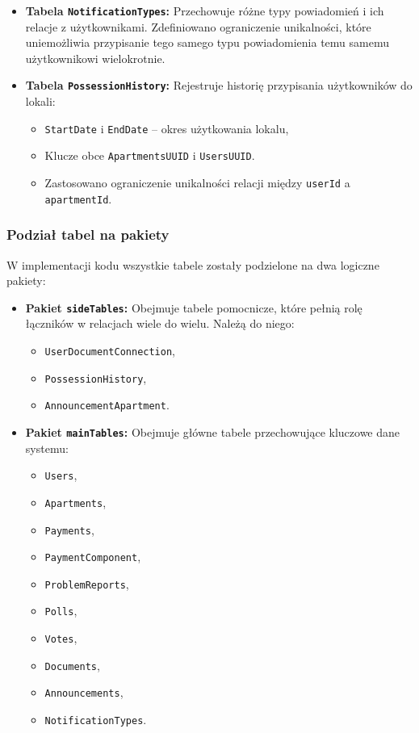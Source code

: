 \begin{itemize}
    \item \textbf{Tabela \texttt{NotificationTypes}:}
    Przechowuje różne typy powiadomień i ich relacje z użytkownikami. Zdefiniowano ograniczenie unikalności, które uniemożliwia przypisanie tego samego typu powiadomienia temu samemu użytkownikowi wielokrotnie.

    \item \textbf{Tabela \texttt{PossessionHistory}:}
    Rejestruje historię przypisania użytkowników do lokali:
    \begin{itemize}
        \item \texttt{StartDate} i \texttt{EndDate} -- okres użytkowania lokalu,
        \item Klucze obce \texttt{ApartmentsUUID} i \texttt{UsersUUID}.
        \item Zastosowano ograniczenie unikalności relacji między \texttt{userId} a \texttt{apartmentId}.
    \end{itemize}
\end{itemize}

\subsubsection{Podział tabel na pakiety}

W implementacji kodu wszystkie tabele zostały podzielone na dwa logiczne pakiety:
\begin{itemize}
    \item \textbf{Pakiet \texttt{sideTables}:} Obejmuje tabele pomocnicze, które pełnią rolę łączników w relacjach wiele do wielu. Należą do niego:
    \begin{itemize}
        \item \texttt{UserDocumentConnection},
        \item \texttt{PossessionHistory},
        \item \texttt{AnnouncementApartment}.
    \end{itemize}

    \item \textbf{Pakiet \texttt{mainTables}:} Obejmuje główne tabele przechowujące kluczowe dane systemu:
		\begin{multicols}{2}\setlength\topskip{0pt}
    \begin{itemize}
        \item \texttt{Users},
        \item \texttt{Apartments},
        \item \texttt{Payments},
        \item \texttt{PaymentComponent},
        \item \texttt{ProblemReports},
        \item \texttt{Polls},
        \item \texttt{Votes},
        \item \texttt{Documents},
        \item \texttt{Announcements},
        \item \texttt{NotificationTypes}.
    \end{itemize}
		\end{multicols}
\end{itemize}

